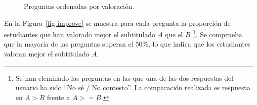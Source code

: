 \documentclass[
  12pt,
  a4paper,
  extrafontsizes,
  onecolumn,
  openright]{memoir}
\begin{document}
\begin{figure}

\begin{minipage}[t]{0.50\linewidth}

{\centering 


}

\end{minipage}%
%
\begin{minipage}[t]{0.50\linewidth}

{\centering 


}

\end{minipage}%
\newline
\begin{minipage}[t]{0.50\linewidth}

{\centering 


}

\end{minipage}%
%
\begin{minipage}[t]{0.50\linewidth}

{\centering 


}

\end{minipage}%

\caption{\label{fig-likert}Preguntas ordenadas por valoración.}

\end{figure}

En la Figura~\ref{fig-improve} se muestra para cada pregunta la
proporción de estudiantes que han valorado mejor el subtitulado \(A\)
que el \(B\) \footnote{Se han eleminado las preguntas en las que una de
  las dos respuestas del usuario ha sido \enquote{No sé / No contesto}.
  La comparación realizada es respuesta en \(A > B\) frente a
  \(A >= B\).}. Se comprueba que la mayoría de las preguntas superan el
50\%, lo que indica que los estudiantes valoran mejor el subtitulado
\(A\).
\end{document}
